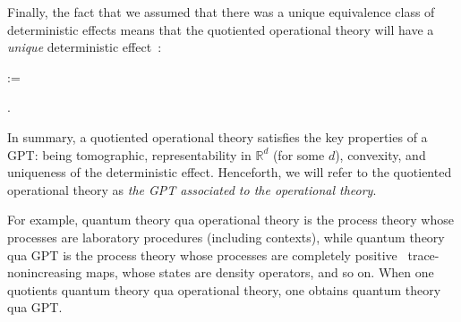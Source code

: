 \documentclass[10pt,twocolumn,aps,groupedaddress,nofootinbib]{revtex4}
\begin{document}
Finally, the fact that we assumed that there was a unique equivalence class of deterministic effects means that the quotiented operational theory will have a {\em unique} deterministic effect~\cite{chiribella2010probabilistic}:
\beq
{}
\quad :=\quad
{}.
\eeq

In summary, a quotiented operational theory satisfies the key properties of a GPT: being tomographic,
 representability in $\mathds{R}^d$ (for some $d$), convexity, and uniqueness of the deterministic effect. Henceforth, we will refer to the quotiented operational theory as {\em the GPT associated to the operational theory}.

For example, quantum theory qua operational theory is the process theory whose processes are laboratory procedures (including contexts), while quantum theory qua GPT is the process theory whose processes are completely positive~\cite{NielsenAndChuang,Schmidcausal} trace-nonincreasing maps, whose states are density operators, and so on. When one quotients quantum theory qua operational theory, one obtains quantum theory qua GPT.
\end{document}
